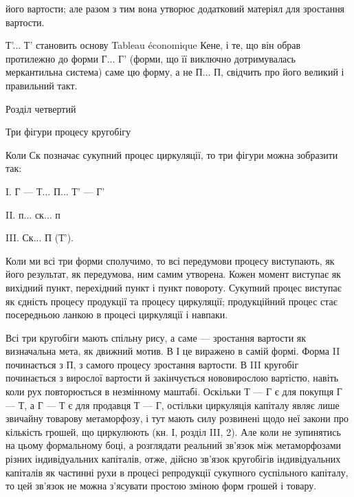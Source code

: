 \parcont{}  %
його вартости; але разом з тим вона утворює додатковий матеріял для
зростання вартости.

Т'... Т' становить основу Tableau économique Кене, і те, що він
обрав протилежно до форми Г... Г' (форми, що її виключно дотримувалась
меркантильна система) саме цю форму, а не П... П, свідчить про
його великий і правильний такт.

Розділ четвертий

Три фігури процесу кругобігу

Коли Ск позначає сукупний процес циркуляції, то три фігури можна
зобразити так:

I. Г — Т... П... Т' — Г'

II. п... ск... п

III. Ск... П (Т').

Коли ми всі три форми сполучимо, то всі передумови процесу виступають,
як його результат, як передумова, ним самим утворена. Кожен
момент виступає як вихідний пункт, перехідний пункт і пункт повороту.
Сукупний процес виступає як єдність процесу продукції та процесу
циркуляції; продукційний процес стає посередньою ланкою в процесі
циркуляції і навпаки.

Всі три кругобіги мають спільну рису, а саме — зростання вартости як
визначальна мета, як движний мотив. В І це виражено в самій формі.
Форма II починається з П, з самого процесу зростання вартости.
В III кругобіг починається з вирослої вартости й закінчується нововирослою
вартістю, навіть коли рух повторюється в незмінному маштабі.
Оскільки Т — Г є для покупця Г — Т, а Г — Т є для продавця Т — Г,
остільки циркуляція капіталу являє лише звичайну товарову метаморфозу,
і тут мають силу розвинені щодо неї закони про кількість грошей, що
циркулюють (кн. І, розділ III, 2). Але коли не зупинятись на цьому
формальному боці, а розглядати реальний зв’язок між метаморфозами
різних індивідуальних капіталів, отже, дійсно зв’язок кругобігів індивідуальних
капіталів як частинні рухи в процесі репродукції сукупного
суспільного капіталу, то цей зв’язок не можна з’ясувати простою зміною
форм грошей і товару.


